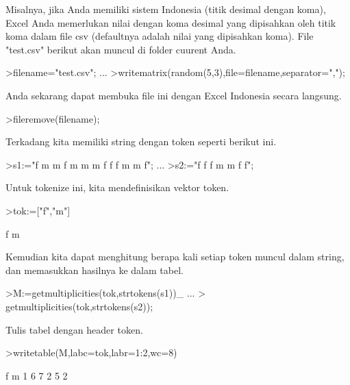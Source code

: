 \documentclass{article}
\begin{document}
\begin{eulernotebook}
\begin{eulercomment}
\begin{eulercomment}
\begin{eulercomment}
Misalnya, jika Anda memiliki sistem Indonesia (titik desimal dengan
koma), Excel Anda memerlukan nilai dengan koma desimal yang dipisahkan
oleh titik koma dalam file csv (defaultnya adalah nilai yang
dipisahkan koma). File "test.csv" berikut akan muncul di folder
cuurent Anda.
\end{eulercomment}
\begin{eulerprompt}
>filename="test.csv"; ...
>writematrix(random(5,3),file=filename,separator=",");
\end{eulerprompt}
\begin{eulercomment}
Anda sekarang dapat membuka file ini dengan Excel Indonesia secara
langsung.
\end{eulercomment}
\begin{eulerprompt}
>fileremove(filename);
\end{eulerprompt}
\begin{eulercomment}
Terkadang kita memiliki string dengan token seperti berikut ini.
\end{eulercomment}
\begin{eulerprompt}
>s1:="f m m f m m m f f f m m f";  ...
>s2:="f f f m m f f";
\end{eulerprompt}
\begin{eulercomment}
Untuk tokenize ini, kita mendefinisikan vektor token.
\end{eulercomment}
\begin{eulerprompt}
>tok:=["f","m"]
\end{eulerprompt}
\begin{euleroutput}
  f
  m
\end{euleroutput}
\begin{eulercomment}
Kemudian kita dapat menghitung berapa kali setiap token muncul dalam
string, dan memasukkan hasilnya ke dalam tabel.
\end{eulercomment}
\begin{eulerprompt}
>M:=getmultiplicities(tok,strtokens(s1))_ ...
>  getmultiplicities(tok,strtokens(s2));
\end{eulerprompt}
\begin{eulercomment}
Tulis tabel dengan header token.
\end{eulercomment}
\begin{eulerprompt}
>writetable(M,labc=tok,labr=1:2,wc=8)
\end{eulerprompt}
\begin{euleroutput}
                 f       m
         1       6       7
         2       5       2
\end{euleroutput}

\end{eulercomment}
\end{eulercomment}
\end{eulernotebook}
\end{document}
